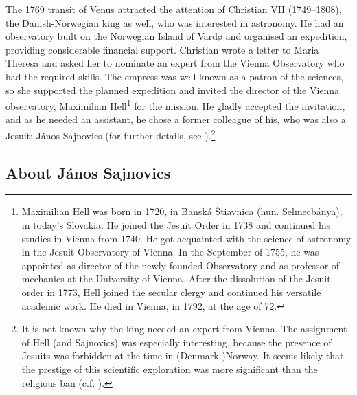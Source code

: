 \documentclass[output=paper,colorlinks,citecolor=brown,arabicfont,chinesefont]{langscibook}
\begin{document}
The 1769 transit of Venus attracted the attention of Christian VII (1749–1808), the Danish-Norwegian king as well, who was interested in astronomy. He had an observatory built on the Norwegian Island of Vardø and organised an expedition, providing considerable financial support. Christian wrote a letter to Maria Theresa and asked her to nominate an expert from the Vienna Observatory who had the required skills. The empress was well-known as a patron of the sciences, so she supported the planned expedition and invited the director of the Vienna observatory, Maximilian Hell\footnote{Maximilian Hell was born in 1720, in Banská Štiavnica (hun. Selmecbánya), in today’s Slovakia. He joined the Jesuit Order in 1738 and continued his studies in Vienna from 1740. He got acquainted with the science of astronomy in the Jesuit Observatory of Vienna. In the September of 1755, he was appointed as director of the newly founded Observatory and as professor of mechanics at the University of Vienna. After the dissolution of the Jesuit order in 1773, Hell joined the secular clergy and continued his versatile academic work. He died in Vienna, in 1792, at the age of 72.} for the mission. He gladly accepted the invitation, and as he needed an assistant, he chose a former colleague of his, who was also a Jesuit: János Sajnovics (for further details, see \citealt[403--404]{MaticsakKeleman2021}).\footnote{It is not known why the king needed an expert from Vienna. The assignment of Hell (and Sajnovics) was especially interesting, because the presence of Jesuits was forbidden at the time in (Denmark-)Norway. It seems likely that the prestige of this scientific exploration was more significant than the religious ban (c.f. \citealt[186]{AspaasKontler2019}).}

\subsection{About János Sajnovics}
\end{document}
